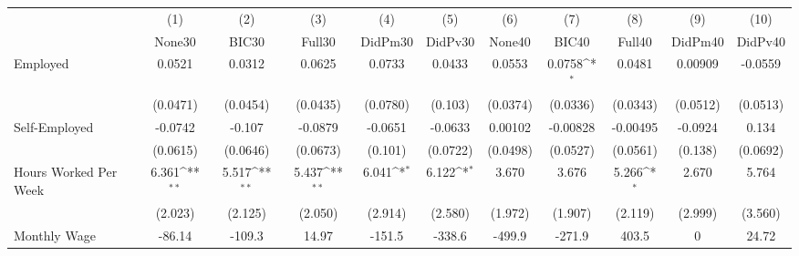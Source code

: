 {
\def\sym#1{\ifmmode^{#1}\else\(^{#1}\)\fi}
\begin{tabular}{l*{10}{c}}
\toprule
            &\multicolumn{1}{c}{(1)}&\multicolumn{1}{c}{(2)}&\multicolumn{1}{c}{(3)}&\multicolumn{1}{c}{(4)}&\multicolumn{1}{c}{(5)}&\multicolumn{1}{c}{(6)}&\multicolumn{1}{c}{(7)}&\multicolumn{1}{c}{(8)}&\multicolumn{1}{c}{(9)}&\multicolumn{1}{c}{(10)}\\
            &\multicolumn{1}{c}{None30}&\multicolumn{1}{c}{BIC30}&\multicolumn{1}{c}{Full30}&\multicolumn{1}{c}{DidPm30}&\multicolumn{1}{c}{DidPv30}&\multicolumn{1}{c}{None40}&\multicolumn{1}{c}{BIC40}&\multicolumn{1}{c}{Full40}&\multicolumn{1}{c}{DidPm40}&\multicolumn{1}{c}{DidPv40}\\
\midrule
Employed    &      0.0521         &      0.0312         &      0.0625         &      0.0733         &      0.0433         &      0.0553         &      0.0758\sym{*}  &      0.0481         &     0.00909         &     -0.0559         \\
            &    (0.0471)         &    (0.0454)         &    (0.0435)         &    (0.0780)         &     (0.103)         &    (0.0374)         &    (0.0336)         &    (0.0343)         &    (0.0512)         &    (0.0513)         \\
\addlinespace
Self-Employed&     -0.0742         &      -0.107         &     -0.0879         &     -0.0651         &     -0.0633         &     0.00102         &    -0.00828         &    -0.00495         &     -0.0924         &       0.134         \\
            &    (0.0615)         &    (0.0646)         &    (0.0673)         &     (0.101)         &    (0.0722)         &    (0.0498)         &    (0.0527)         &    (0.0561)         &     (0.138)         &    (0.0692)         \\
\addlinespace
Hours Worked Per Week&       6.361\sym{**} &       5.517\sym{**} &       5.437\sym{**} &       6.041\sym{*}  &       6.122\sym{*}  &       3.670         &       3.676         &       5.266\sym{*}  &       2.670         &       5.764         \\
            &     (2.023)         &     (2.125)         &     (2.050)         &     (2.914)         &     (2.580)         &     (1.972)         &     (1.907)         &     (2.119)         &     (2.999)         &     (3.560)         \\
\addlinespace
Monthly Wage&      -86.14         &      -109.3         &       14.97         &      -151.5         &      -338.6         &      -499.9         &      -271.9         &       403.5         &           0         &       24.72         \\

\end{tabular}}
